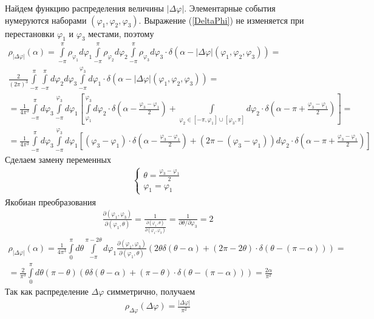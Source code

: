 \documentclass[12pt]{article}
\renewcommand{\l}{\left( }
\renewcommand{\r}{\right) }
\renewcommand{\phi}{\varphi}
\newcommand{\pd}{\partial}
\newcommand{\br}[1]{\l {#1} \r}
\newcommand{\pint}{\int\limits_{-\pi}^{\pi}}
\newcommand{\jacobian}[2]{\frac{\pd \br{#1}}{\pd \br{#2}}}
\newcommand{\abs}[1]{\left| #1 \right|}
\begin{document}
 Найдем функцию распределения величины $\abs{\Delta \phi}$. Элементарные события нумеруются наборами $\br{\phi_1, \phi_2, \phi_3}$. Выражение (\ref{DeltaPhi}) не изменяется при перестановки $\phi_1$ и $\phi_3$ местами, поэтому
\begin{gather}
\rho_{\abs{\Delta \phi}} \br{\alpha} = \pint \rho_{\phi_1} d\phi_1 \pint \rho_{\phi_2} d\phi_2 \pint \rho_{\phi_3} d\phi_3 \cdot \delta \br{\alpha - \abs{\Delta \phi} \br{\phi_1, \phi_2, \phi_3}} = \nonumber \\
\frac{2}{\br{2\pi}^3} \pint \pint d\phi_2 d\phi_3 \int\limits_{-\pi}^{\phi_3} d\phi_1 \cdot \delta \br{\alpha - \abs{\Delta \phi} \br{\phi_1, \phi_2, \phi_3}} = \\
=\frac{1}{4\pi^3} \pint d\phi_3 \int\limits_{-\pi}^{\phi_3} d\phi_1 \left[ \int\limits_{\phi_1}^{\phi_3} d\phi_2 \cdot \delta \br{\alpha - \frac{\phi_3 - \phi_1}{2}} + \int\limits_{\phi_2 \in \left[ -\pi, \phi_1 \right] \cup \left[ \phi_3, \pi\right]} d\phi_2 \cdot \delta \br{\alpha - \pi + \frac{\phi_3 -\phi_1}{2}} \right] = \nonumber \\
=\frac{1}{4\pi^3} \pint d\phi_3 \int\limits_{-\pi}^{\phi_3} d\phi_1 \left[ \br{\phi_3 -\phi_1} \cdot \delta \br{\alpha - \frac{\phi_3 - \phi_1}{2}} + \br{2\pi - \br{\phi_3 - \phi_1}} d\phi_2 \cdot \delta \br{\alpha - \pi + \frac{\phi_3 -\phi_1}{2}} \right] \nonumber
\end{gather}
Сделаем замену переменных
\begin{eqnarray}
\begin{cases}
\theta = \frac{\phi_3 -\phi_1}{2} \\
\phi_1 = \phi_1
\end{cases}
\end{eqnarray}
Якобиан преобразования
\begin{eqnarray}
\jacobian{\phi_1, \phi_3}{\phi_1, \theta} = \frac{1}{\jacobian{\phi_1, \theta}{\phi_1, \phi_3}} = \frac{1}{\pd \theta / \pd \phi_3} = 2
\end{eqnarray}
\begin{eqnarray}
\rho_{\abs{\Delta \phi}} \br{\alpha} = \frac{1}{4\pi^3} \int\limits_0^\pi d\theta \int\limits_{-\pi}^{\pi - 2\theta} d\phi_1 \jacobian{\phi_1, \phi_3}{\phi_1, \theta} \br{2\theta \delta \br{\theta - \alpha} + \br{2\pi - 2\theta} \cdot \delta \br{\theta - \br{\pi - \alpha}}} = \nonumber \\
= \frac{2}{\pi^3} \int\limits_0^\pi d\theta \br{\pi - \theta} \br{\theta \delta \br{\theta - \alpha} + \br{\pi - \theta} \cdot \delta \br{\theta - \br{\pi - \alpha}}} = \frac{2\alpha}{\pi^2}
\end{eqnarray}
Так как распределение $\Delta \phi$ симметрично, получаем
\begin{eqnarray}
\rho_{\Delta \phi} \br{\Delta \phi} = \frac{\abs{\Delta \phi}}{\pi^2}
\end{eqnarray}
\end{document}
